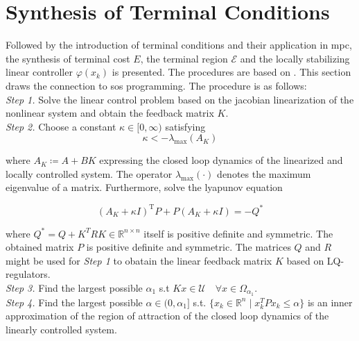 \documentclass[10pt,a4paper]{article}
\begin{document}
\section{Synthesis of Terminal Conditions}
\label{sec:synTermCond}
Followed by the introduction of terminal conditions and their application in \gls{mpc}, the synthesis of terminal cost $E$, the
terminal region $\mathcal{E}$ and the locally stabilizing linear controller $\varphi(x_{k})$ is presented. The procedures are based
on \cite{CHEN19981205}. This section draws the connection to \gls{sos} programming. The procedure is as follows:\\

\textit{Step 1.} Solve the linear control problem based on the jacobian linearization of the nonlinear system and obtain the feedback
matrix $K$.\\

\textit{Step 2.} Choose a constant $\kappa \in [0,\infty)$ satisfying
\begin{equation}
	\kappa < -\lambda_{\text{max}}(A_K)
\end{equation}

where $A_K \coloneqq A + BK$ expressing the closed loop dynamics of the linearized and locally controlled system. The operator
$\lambda_{\text{max}}(\cdot)$ denotes the maximum eigenvalue of a matrix. Furthermore, solve the lyapunov equation

\begin{equation}
	\left(A_K+\kappa I\right)^{\mathrm{T}} P+P\left(A_K+\kappa I\right)=-Q^*
\end{equation}

where $Q^* = Q + K^T R K \in \mathbb{R}^{n \times n}$ itself is positive definite and symmetric. The obtained matrix $P$ is 
positive definite and symmetric. The matrices $Q$ and $R$ might be used for \textit{Step 1} to obatain the linear feedback
matrix $K$ based on LQ-regulators.\\

\textit{Step 3.} Find the largest possible $\alpha_1$ s.t $Kx \in \mathcal{U} \quad \forall x \in \Omega_{\alpha_1}$.\\

\textit{Step 4.} Find the largest possible $\alpha \in (0,\alpha_1]$ s.t. $\{x_k \in \mathbb{R}^n \mid x_k^TPx_k \leq \alpha \}$ is an 
inner approximation of the region of attraction of the closed loop dynamics of the linearly controlled system.
\end{document}
